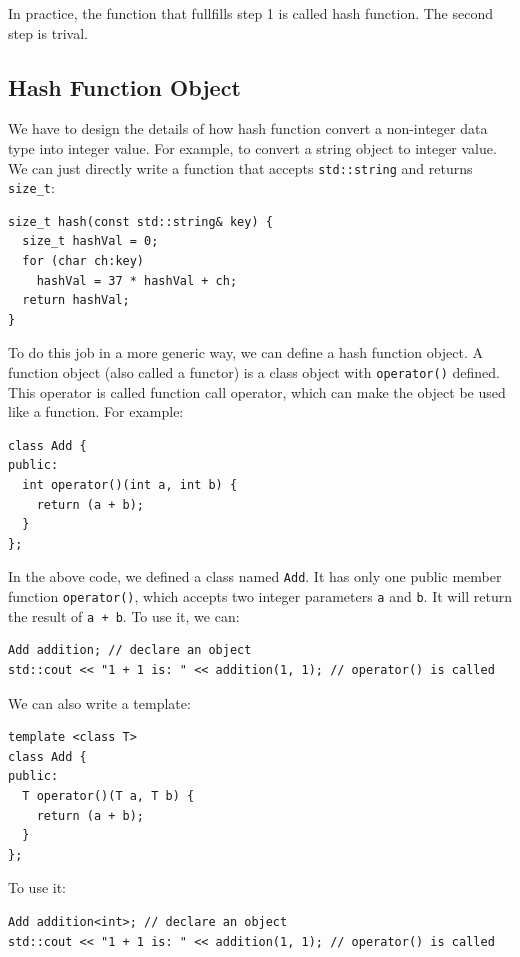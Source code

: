 \documentclass[11pt]{book}
\begin{document}
In practice, the function that fullfills step 1 is called hash function. The second step is trival.

\subsection{Hash Function Object}
\label{sec:orgf37d24f}
We have to design the details of how hash function convert a non-integer data type into integer value. For example, to convert a string object to integer value. We can just directly write a function that accepts \texttt{std::string} and returns \texttt{size\_t}:
\begin{verbatim}
size_t hash(const std::string& key) {
  size_t hashVal = 0;
  for (char ch:key)
    hashVal = 37 * hashVal + ch;
  return hashVal;
}
\end{verbatim}

To do this job in a more generic way, we can define a hash function object. A function object (also called a functor) is a class object with \texttt{operator()} defined. This operator is called function call operator, which can make the object be used like a function. For example:
\begin{verbatim}
class Add {
public:
  int operator()(int a, int b) {
    return (a + b);
  }
};
\end{verbatim}

In the above code, we defined a class named \texttt{Add}. It has only one public member function \texttt{operator()}, which accepts two integer parameters \texttt{a} and \texttt{b}. It will return the result of \texttt{a + b}. To use it, we can:
\begin{verbatim}
Add addition; // declare an object
std::cout << "1 + 1 is: " << addition(1, 1); // operator() is called
\end{verbatim}

We can also write a template:
\begin{verbatim}
template <class T>
class Add {
public:
  T operator()(T a, T b) {
    return (a + b);
  }
};
\end{verbatim}

To use it:
\begin{verbatim}
Add addition<int>; // declare an object
std::cout << "1 + 1 is: " << addition(1, 1); // operator() is called
\end{verbatim}
\end{document}
